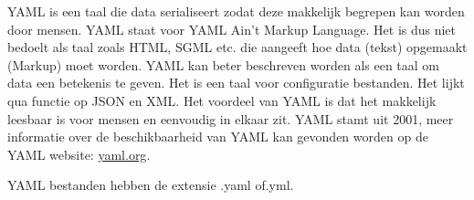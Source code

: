 YAML is een taal die data serialiseert zodat deze makkelijk begrepen kan worden door mensen. YAML staat voor YAML Ain't Markup Language. Het is dus niet bedoelt als taal zoals HTML, SGML etc. die aangeeft hoe data (tekst) opgemaakt (Markup) moet worden. YAML kan beter beschreven worden als een taal om data een betekenis te geven. Het is een taal voor configuratie bestanden. Het lijkt qua functie op JSON en XML. Het voordeel van YAML is dat het makkelijk leesbaar is voor mensen en eenvoudig in elkaar zit. YAML stamt uit 2001, meer informatie over de beschikbaarheid van YAML kan gevonden worden op de YAML website: \url{yaml.org}.

YAML bestanden hebben de extensie .yaml of.yml.

